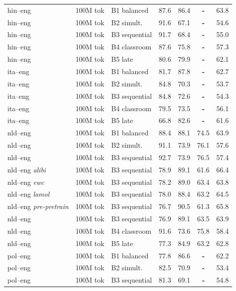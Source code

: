 \begin{table}[t]
\begin{tabular}{lll cc cc}
hin--eng & 100M tok & B1 balanced & 87.6 & 86.4 & \textbf{-} & 63.8 \\
hin--eng & 100M tok & B2 simult. & 91.6 & 67.1 & \textbf{-} & 54.6 \\
hin--eng & 100M tok & B3 sequential & 91.7 & 68.4 & \textbf{-} & 55.0 \\
hin--eng  & 100M tok & B4 classroom & 87.6 & 75.8 & \textbf{-} & 57.3 \\
hin--eng  & 100M tok & B5 late & 80.6 & 79.9 & \textbf{-} & 62.1 \\
ita--eng & 100M tok & B1 balanced & 81.7 & 87.8 & \textbf{-} & 62.7 \\
ita--eng & 100M tok & B2 simult. & 84.8 & 70.3 & \textbf{-} & 53.7 \\
ita--eng & 100M tok & B3 sequential & 84.8 & 72.6 & \textbf{-} & 54.3 \\
ita--eng  & 100M tok & B4 classroom & 79.5 & 73.5 & \textbf{-} & 56.1 \\
ita--eng  & 100M tok & B5 late & 66.8 & 82.6 & \textbf{-} & 61.6 \\
nld--eng & 100M tok & B1 balanced & 88.4 & 88.1 & 74.5 & 63.9 \\
nld--eng & 100M tok & B2 simult. & 91.1 & 73.9 & 76.1 & 57.6 \\
nld--eng & 100M tok & B3 sequential & 92.7 & 73.9 & 76.5 & 57.4 \\
nld--eng {\scriptsize\textit{alibi}} & 100M tok & B3 sequential & 78.9 & 89.1 & 61.6 & 66.4 \\
nld--eng {\scriptsize\textit{ewc}} & 100M tok & B3 sequential & 78.2 & 89.0 & 63.4 & 63.8 \\
nld--eng {\scriptsize\textit{lamol}} & 100M tok & B3 sequential & 78.0 & 88.4 & 63.2 & 64.5 \\
nld--eng {\scriptsize\textit{pre-pretrain}} & 100M tok & B3 sequential & 76.7 & 90.5 & 61.3 & 65.8 \\
nld--eng  & 100M tok & B3 sequential & 76.9 & 89.1 & 63.5 & 63.9 \\
nld--eng & 100M tok & B4 classroom & 91.6 & 73.6 & 75.8 & 58.4 \\
nld--eng  & 100M tok & B5 late & 77.3 & 84.9 & 63.2 & 62.8 \\
pol--eng & 100M tok & B1 balanced & 77.8 & 86.6 & \textbf{-} & 62.2 \\
pol--eng & 100M tok & B2 simult. & 82.5 & 70.9 & \textbf{-} & 53.4 \\
pol--eng & 100M tok & B3 sequential & 81.3 & 69.1 & \textbf{-} & 54.8 \\

\end{tabular}
\end{table}
